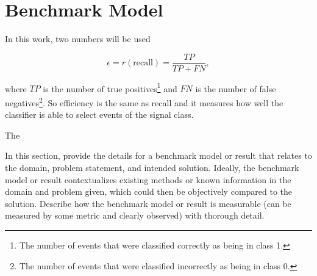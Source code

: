 
\section{Benchmark Model}

In this work, two numbers will be used 

\begin{equation} \label{eq:eff}
\epsilon = r (\textrm{recall}) = \frac{TP}{TP + FN},
\end{equation}

where $TP$ is the number of true positives\footnote{The number of events that were classified correctly as being in class 1.} and $FN$ is the number of false negatives\footnote{The number of events that were classified incorrectly as being in class 0.}. So efficiency is the same as recall and it measures how well the classifier is able to select events of the signal class.

The 


In this section, provide the details for a benchmark model or result that relates to the domain, problem statement, and intended solution. Ideally, the benchmark model or result contextualizes existing methods or known information in the domain and problem given, which could then be objectively compared to the solution. Describe how the benchmark model or result is measurable (can be measured by some metric and clearly observed) with thorough detail.



